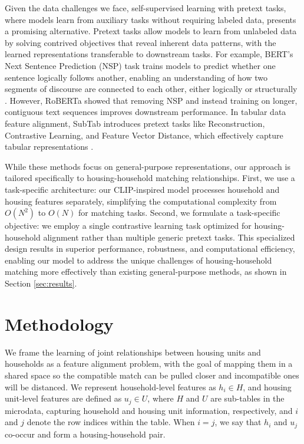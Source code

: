 \documentclass[]{nature_mod}
\begin{document}
Given the data challenges we face, self-supervised learning with pretext tasks, where models learn from auxiliary tasks without requiring labeled data, presents a promising alternative. Pretext tasks allow models to learn from unlabeled data by solving contrived objectives that reveal inherent data patterns, with the learned representations transferable to downstream tasks. For example, BERT’s Next Sentence Prediction (NSP) task trains models to predict whether one sentence logically follows another, enabling an understanding of how two segments of discourse are connected to each other, either logically or structurally \cite{devlin2018bert}. However, RoBERTa \cite{liu2019roberta} showed that removing NSP and instead training on longer, contiguous text sequences improves downstream performance. In tabular data feature alignment, SubTab introduces pretext tasks like Reconstruction, Contrastive Learning, and Feature Vector Distance, which effectively capture tabular representations \cite{ucar2021subtab}. 

While these methods focus on general-purpose representations, our approach is tailored specifically to housing-household matching relationships. First, we use a task-specific architecture: our CLIP-inspired model processes household and housing features separately, simplifying the computational complexity from $O(N^2)$ to $O(N)$ for matching tasks. Second, we formulate a task-specific objective: we employ a single contrastive learning task optimized for housing-household alignment rather than multiple generic pretext tasks. This specialized design results in superior performance, robustness, and computational efficiency, enabling our model to address the unique challenges of housing-household matching more effectively than existing general-purpose methods, as shown in Section \ref{sec:results}. 

\section{Methodology}

We frame the learning of joint relationships between housing units and households as a feature alignment problem, with the goal of mapping them in a shared space so the compatible match can be pulled closer and incompatible ones will be distanced. We represent household-level features as $h_i \in H$, and housing unit-level features are defined as $u_j \in U$, where $H$ and $U$ are sub-tables in the microdata, capturing household and housing unit information, respectively, and $i$ and $j$ denote the row indices within the table. When $i=j$, we say that $h_i$ and $u_j$ co-occur and form a housing-household pair. 
\end{document}

